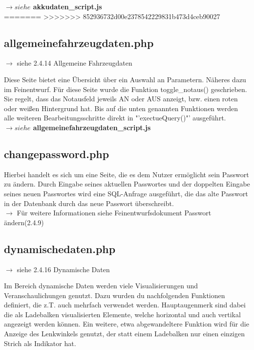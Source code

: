 \documentclass[fontsize = 12pt, paper = a4]{scrreprt}
\begin{document}
\textbf{$\rightarrow siehe$ akkudaten\_script.js}\\

=======
\label{allgemeinefahrzeugdatenphp}
>>>>>>> 852936732d00e2378542229831b473d4ceb90027
\subsection{allgemeinefahrzeugdaten.php}
$\rightarrow$ siehe 2.4.14 Allgemeine Fahrzeugdaten

Diese Seite bietet eine Übersicht über ein Auswahl an Parametern. Näheres dazu im Feinentwurf. Für diese Seite wurde die Funktion toggle\_notaus() geschrieben. Sie regelt, dass das Notausfeld jeweils AN oder AUS anzeigt, bzw. einen roten oder weißen Hintergrund hat. Bis auf die unten genannten Funktionen werden alle weiteren Bearbeitungsschritte direkt in "'exectueQuery()"' ausgeführt. \\

\textbf{$\rightarrow siehe$ allgemeinefahrzeugdaten\_script.js}\\

\subsection{changepassword.php}
Hierbei handelt es sich um eine Seite, die es dem Nutzer ermöglicht sein Passwort zu ändern. Durch Eingabe seines aktuellen Passwortes und der doppelten Eingabe seines neuen Passwortes wird eine SQL-Anfrage ausgeführt, die das alte Passwort in der Datenbank durch das neue Passwort überschreibt.\\
$\rightarrow$ Für weitere Informationen siehe Feinentwurfsdokument \glqq Passwort ändern\grqq (2.4.9)

\subsection{dynamischedaten.php}
$\rightarrow$ siehe 2.4.16 Dynamische Daten

Im Bereich dynamische Daten werden viele Visualisierungen und Veranschaulichungen genutzt. Dazu wurden du nachfolgenden Funktionen definiert, die z.T. auch mehrfach verwendet werden. Hauptaugenmerk sind dabei die als Ladebalken visualisierten Elemente, welche horizontal und auch vertikal angezeigt werden können. Ein weitere, etwa abgewandeltere Funktion wird für die Anzeige des Lenkwinkels genutzt, der statt einem Ladebalken nur einen einzigen Strich als Indikator hat.\\
\end{document}
